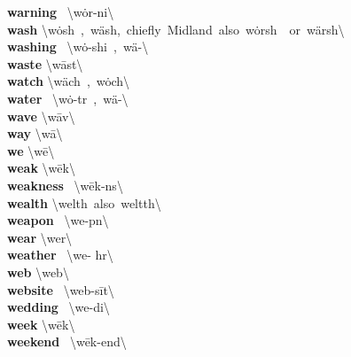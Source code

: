 \documentclass[10pt,a4paper]{article}
\begin{document}
\begin{multicols}{2}
\textbf{ warning }\quad \ \textbackslash \textprimstress w\.{o}r-ni\engma \textbackslash \\
\textbf{ wash }\quad \textbackslash \textprimstress w\.{o}sh\ ,\ \textprimstress w\"{a}sh,\ chiefly\ Midland\ also\ \textprimstress w\.{o}rsh\ \ or\ \textprimstress w\"{a}rsh\textbackslash \\
\textbf{ washing }\quad \ \textbackslash \textprimstress w\.{o}-shi\engma \ ,\ \textprimstress w\"{a}-\textbackslash \\
\textbf{ waste }\quad \textbackslash \textprimstress w\={a}st\textbackslash \\
\textbf{ watch }\quad \textbackslash \textprimstress w\"{a}ch\ ,\ \textprimstress w\.{o}ch\textbackslash \\
\textbf{ water }\quad \ \textbackslash \textprimstress w\.{o}-t\textschwa r\ ,\ \textprimstress w\"{a}-\textbackslash \\
\textbf{ wave }\quad \textbackslash \textprimstress w\={a}v\textbackslash \\
\textbf{ way }\quad \textbackslash \textprimstress w\={a}\textbackslash \\
\textbf{ we }\quad \textbackslash \textprimstress w\={e}\textbackslash \\
\textbf{ weak }\quad \textbackslash \textprimstress w\={e}k\textbackslash \\
\textbf{ weakness }\quad \ \textbackslash \textprimstress w\={e}k-n\textschwa s\textbackslash \\
\textbf{ wealth }\quad \textbackslash \textprimstress welth\ also\ \textprimstress weltth\textbackslash \\
\textbf{ weapon }\quad \ \textbackslash \textprimstress we-p\textschwa n\textbackslash \\
\textbf{ wear }\quad \textbackslash \textprimstress wer\textbackslash \\
\textbf{ weather }\quad \ \textbackslash \textprimstress we- h\textschwa r\textbackslash \\
\textbf{ web }\quad \textbackslash \textprimstress web\textbackslash \\
\textbf{ website }\quad \ \textbackslash \textprimstress web-\textsecstress s\={i}t\textbackslash \\
\textbf{ wedding }\quad \ \textbackslash \textprimstress we-di\engma \textbackslash \\
\textbf{ week }\quad \textbackslash \textprimstress w\={e}k\textbackslash \\
\textbf{ weekend }\quad \ \textbackslash \textprimstress w\={e}k-\textsecstress end\textbackslash \\

\end{multicols}
\end{document}
